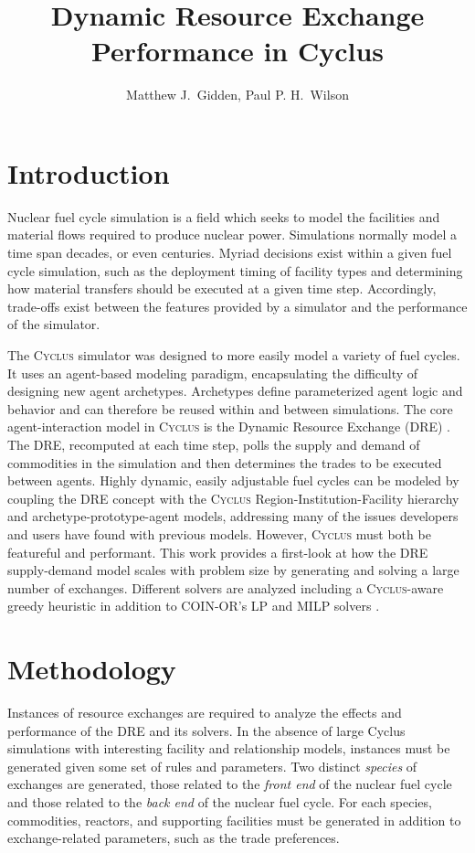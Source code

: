 \documentclass{anstrans}
\title{Dynamic Resource Exchange Performance in Cyclus}
\author{Matthew J.~Gidden, Paul P. H.~Wilson}
\institute{
University of Wisconsin, Madison WI
}
\newcommand{\Cyclus}{\textsc{Cyclus}}
\begin{document}
\section{Introduction}

Nuclear fuel cycle simulation is a field which seeks to model the facilities and
material flows required to produce nuclear power. Simulations normally model a
time span decades, or even centuries. Myriad decisions exist within a given fuel
cycle simulation, such as the deployment timing of facility types and determining
how material transfers should be executed at a given time step. Accordingly,
trade-offs exist between the features provided by a simulator and the performance
of the simulator.

The \Cyclus{} simulator \cite{cyclus2014} was designed to more easily model a
variety of fuel cycles. It uses an agent-based modeling paradigm, encapsulating
the difficulty of designing new agent archetypes. Archetypes define
parameterized agent logic and behavior and can therefore be reused within and
between simulations. The core agent-interaction model in \Cyclus{} is the
Dynamic Resource Exchange (DRE) \cite{gidden_agent-based_2013,
  gidden_agent-based_2014}. The DRE, recomputed at each time step, polls the
supply and demand of commodities in the simulation and then determines the
trades to be executed between agents. Highly dynamic, easily adjustable fuel
cycles can be modeled by coupling the DRE concept with the \Cyclus{}
Region-Institution-Facility hierarchy and archetype-prototype-agent models,
addressing many of the issues developers and users have found with previous
models. However, \Cyclus{} must both be featureful and performant. This work
provides a first-look at how the DRE supply-demand model scales with problem
size by generating and solving a large number of exchanges. Different solvers
are analyzed including a \Cyclus{}-aware greedy heuristic in addition to
COIN-OR's LP and MILP solvers \cite{coinclp, coincbc}.

\section{Methodology}

Instances of resource exchanges are required to analyze the effects and
performance of the DRE and its solvers. In the absence of large Cyclus
simulations with interesting facility and relationship models, instances must be
generated given some set of rules and parameters. Two distinct \textit{species}
of exchanges are generated, those related to the \textit{front end} of the
nuclear fuel cycle and those related to the \textit{back end} of the nuclear
fuel cycle. For each species, commodities, reactors, and supporting facilities
must be generated in addition to exchange-related parameters, such as the trade
preferences.
\end{document}
